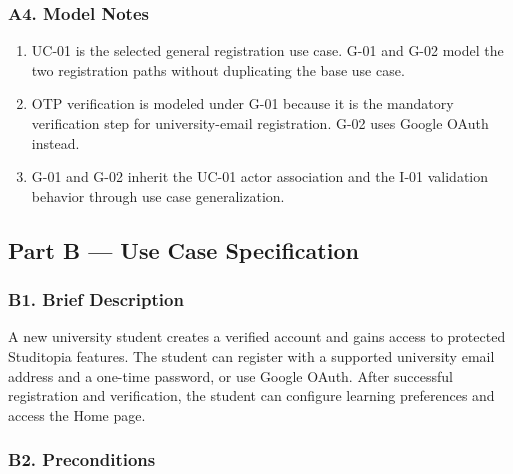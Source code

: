 \documentclass[12pt]{article}
\begin{document}
\subsubsection*{A4. Model Notes}
\par\medskip

\begin{enumerate}
\item UC-01 is the selected general registration use case. G-01 and G-02 model the two registration paths without duplicating the base use case.
\item OTP verification is modeled under G-01 because it is the mandatory verification step for university-email registration. G-02 uses Google OAuth instead.
\item G-01 and G-02 inherit the UC-01 actor association and the I-01 validation behavior through use case generalization.
\end{enumerate}
\par\medskip

\hypertarget{sec:part-b-use-case-specification}{}
\subsection*{Part B --- Use Case Specification}
\par\medskip

\hypertarget{sec:b1-brief-description}{}
\subsubsection*{B1. Brief Description}
\par\medskip

A new university student creates a verified account and gains access to protected Studitopia features. The student can register with a supported university email address and a one-time password, or use Google OAuth. After successful registration and verification, the student can configure learning preferences and access the Home page.
\par\medskip

\hypertarget{sec:b2-preconditions}{}
\subsubsection*{B2. Preconditions}
\par\medskip
\end{document}

